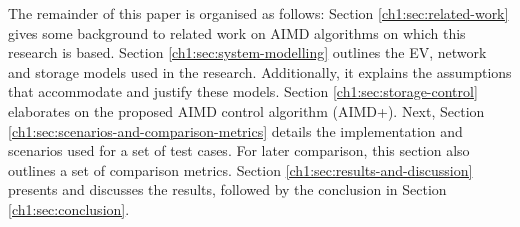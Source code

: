 The remainder of this paper is organised as follows: Section \ref{ch1:sec:related-work} gives some background to related work on AIMD algorithms on which this research is based. Section \ref{ch1:sec:system-modelling} outlines the EV, network and storage models used in the research. Additionally, it explains the assumptions that accommodate and justify these models. Section \ref{ch1:sec:storage-control} elaborates on the proposed AIMD control algorithm (AIMD+). Next, Section \ref{ch1:sec:scenarios-and-comparison-metrics} details the implementation and scenarios used for a set of test cases. For later comparison, this section also outlines a set of comparison metrics. Section \ref{ch1:sec:results-and-discussion} presents and discusses the results, followed by the conclusion in Section \ref{ch1:sec:conclusion}.